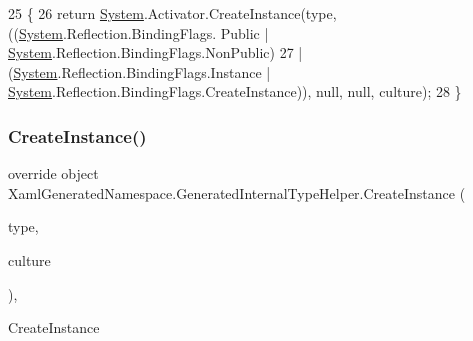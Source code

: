 \begin{DoxyCode}
25                                                                                                            
        \{
26             \textcolor{keywordflow}{return} \hyperlink{namespaceSystem}{System}.Activator.CreateInstance(type, ((\hyperlink{namespaceSystem}{System}.Reflection.BindingFlags.
      Public | \hyperlink{namespaceSystem}{System}.Reflection.BindingFlags.NonPublic) 
27                             | (\hyperlink{namespaceSystem}{System}.Reflection.BindingFlags.Instance | 
      \hyperlink{namespaceSystem}{System}.Reflection.BindingFlags.CreateInstance)), null, null, culture);
28         \}
\end{DoxyCode}
\mbox{\label{classXamlGeneratedNamespace_1_1GeneratedInternalTypeHelper_aefb7a98fceb9c287cef4756942f441d1}} 
\subsubsection{\texorpdfstring{Create\+Instance()}{CreateInstance()}\hspace{0.1cm}{\footnotesize\ttfamily [2/3]}}
{\footnotesize\ttfamily override object Xaml\+Generated\+Namespace.\+Generated\+Internal\+Type\+Helper.\+Create\+Instance (\begin{DoxyParamCaption}\item[{System.\+Type}]{type,  }\item[{System.\+Globalization.\+Culture\+Info}]{culture }\end{DoxyParamCaption})\hspace{0.3cm}{\ttfamily [inline]}, {\ttfamily [protected]}}



Create\+Instance 


